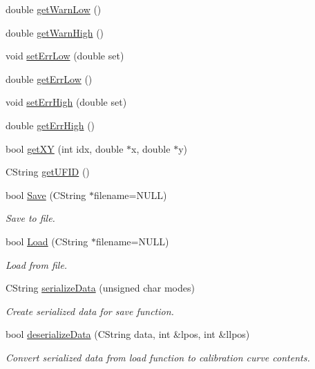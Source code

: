 \begin{DoxyCompactItemize}
\item 
double \hyperlink{classCCalibrationCurve_a04bfb1a44ea24cd150e43545057d0dec}{getWarnLow} ()
\item 
double \hyperlink{classCCalibrationCurve_ae84cc3903f72ea9763a9d66ec7214390}{getWarnHigh} ()
\item 
void \hyperlink{classCCalibrationCurve_a86176710dba4a8dc6d7e356363438f6c}{setErrLow} (double set)
\item 
double \hyperlink{classCCalibrationCurve_a08572e94d45f04cc2648a8c768a7d265}{getErrLow} ()
\item 
void \hyperlink{classCCalibrationCurve_a1886adaef9e94b57cf71a27f4f5bacfe}{setErrHigh} (double set)
\item 
double \hyperlink{classCCalibrationCurve_a5d04d0a4271727ea19cd22ed641cfa90}{getErrHigh} ()
\item 
bool \hyperlink{classCCalibrationCurve_a1f6e4bed16361c720b73de1a5d5e38c5}{getXY} (int idx, double $\ast$x, double $\ast$y)
\item 
CString \hyperlink{classCCalibrationCurve_a8d0fb3d3298adf5731797fc14aec1fc9}{getUFID} ()
\end{DoxyCompactItemize}
\begin{Indent}{\bf }\par
{\em \label{_amgrpd41d8cd98f00b204e9800998ecf8427e}
 }\begin{DoxyCompactItemize}
\item 
bool \hyperlink{classCCalibrationCurve_a6b9ae54fcc8556e9b9b805078dba7a4f}{Save} (CString $\ast$filename=NULL)
\begin{DoxyCompactList}\small\item\em Save to file. \item\end{DoxyCompactList}\item 
bool \hyperlink{classCCalibrationCurve_a117574561109aaba0a020716e9b14be7}{Load} (CString $\ast$filename=NULL)
\begin{DoxyCompactList}\small\item\em Load from file. \item\end{DoxyCompactList}\item 
CString \hyperlink{classCCalibrationCurve_a7036817ba7417322803d9eeee0170261}{serializeData} (unsigned char modes)
\begin{DoxyCompactList}\small\item\em Create serialized data for save function. \item\end{DoxyCompactList}\item 
bool \hyperlink{classCCalibrationCurve_a558b593e6e030ce267feb5196eb629da}{deserializeData} (CString data, int \&lpos, int \&llpos)
\begin{DoxyCompactList}\small\item\em Convert serialized data from load function to calibration curve contents. \item\end{DoxyCompactList}\end{DoxyCompactItemize}
\end{Indent}
